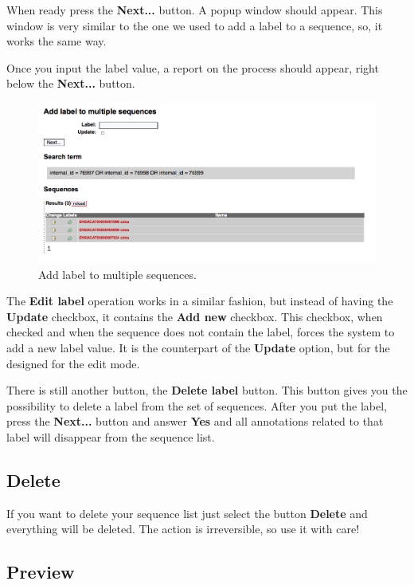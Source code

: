 When ready press the \textbf{Next...} button. A popup window should appear.
This window is very similar to the one we used to add a label to a sequence, so, it works the same way.

Once you input the label value, a report on the process should appear, right below the \textbf{Next...} button.

\begin{figure}[ht]
  \centering
    \includegraphics[scale=0.4]{add_label_batch.png}
  \caption{Add label to multiple sequences.}
  \label{fig:add_label_batch}
\end{figure}

The \textbf{Edit label} operation works in a similar fashion, but instead of having the \textbf{Update} checkbox,
it contains the \textbf{Add new} checkbox. This checkbox, when checked and when the sequence does not contain the
label, forces the system to add a new label value. It is the counterpart of the \textbf{Update} option, but for
the designed for the edit mode.

There is still another button, the \textbf{Delete label} button. This button gives you the possibility
to delete a label from the set of sequences. After you put the label, press the \textbf{Next...} button and
answer \textbf{Yes} and all annotations related to that label will disappear from the sequence list.

\subsection{Delete}

If you want to delete your sequence list just select the button \textbf{Delete} and
everything will be deleted. The action is irreversible, so use it with care!

\subsection{Preview}

